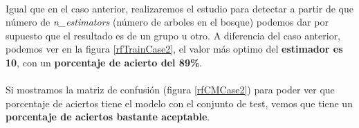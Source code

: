 \paragraph{}
Igual que en el caso anterior, realizaremos el estudio para detectar a partir de que número de \textit{n\_estimators}\cite{ref:rf_random_forest_classifier} (número de arboles en el bosque) podemos dar por supuesto que el resultado es de un grupo u otro. A diferencia del caso anterior, podemos ver en la figura \ref{rfTrainCase2}, el valor más optimo del \textbf{estimador es 10}, con un \textbf{porcentaje de acierto del 89\%}.

\paragraph{}
Si mostramos la matriz de confusión\cite{ref:confusion_matrix} (figura \ref{rfCMCase2}) para poder ver que porcentaje de aciertos tiene el modelo con el conjunto de test, vemos que tiene un \textbf{porcentaje de aciertos bastante aceptable}.

